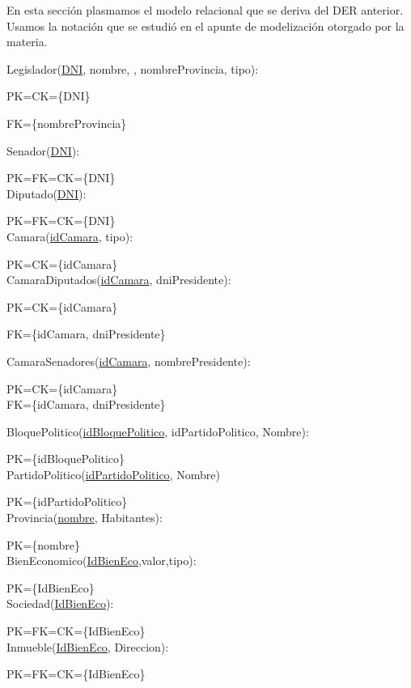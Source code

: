 En esta secci\'on plasmamos el modelo relacional que se deriva del DER anterior. Usamos la notaci\'on que se estudi\'o en el apunte de modelizaci\'on otorgado por la materia.

Legislador(\underline{DNI}, nombre, , nombreProvincia, tipo):

PK=CK={\{DNI}\}

FK={\{nombreProvincia}\}

Senador(\underline{DNI}):

PK=FK=CK={\{DNI}\}\\

Diputado(\underline{DNI}):

PK=FK=CK={\{DNI}\}\\

Camara(\underline{idCamara}, tipo):

PK=CK={\{idCamara}\}\\

CamaraDiputados(\underline{idCamara}, dniPresidente):

PK=CK={\{idCamara}\}

FK={\{idCamara, dniPresidente}\}

CamaraSenadores(\underline{idCamara}, nombrePresidente):

PK=CK={\{idCamara}\}\\

FK={\{idCamara, dniPresidente}\}

BloquePolitico(\underline{idBloquePolitico}, idPartidoPolitico, Nombre):

PK={\{idBloquePolitico}\}\\

PartidoPolitico(\underline{idPartidoPolitico}, Nombre)

PK={\{idPartidoPolitico}\}\\

Provincia(\underline{nombre}, Habitantes):

PK={\{nombre}\}\\

BienEconomico(\underline{IdBienEco},valor,tipo):

PK={\{IdBienEco}\}\\

Sociedad(\underline{IdBienEco}):

PK=FK=CK={\{IdBienEco}\}\\

Inmueble(\underline{IdBienEco}, Direccion):

PK=FK=CK={\{IdBienEco}\}\\

